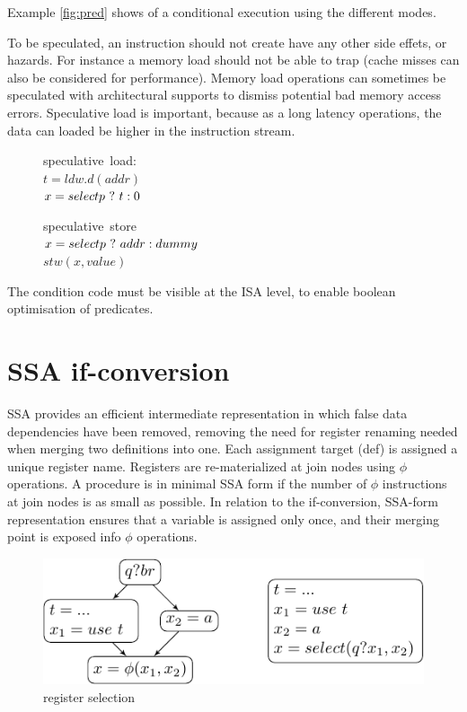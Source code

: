 Example \ref{fig:pred} shows of a conditional execution using the different modes.

To be speculated, an instruction should not create have any other side effets, or hazards. For instance a memory load should not be able to trap (cache misses can also be considered for performance). 
Memory load operations can sometimes be speculated with architectural supports to dismiss potential bad memory access errors. Speculative load is important, because as a long latency operations, the data can loaded be higher in the instruction stream.

\begin{figure}
\begin{minipage}[t]{4cm}
\mbox{speculative load:} \\
$t = ldw.d(addr) $ \\
$x = select p ~?~ t : 0 $ \\
\end{minipage}
\begin{minipage}[t]{4cm}
\mbox{speculative store} \\
$x=select p ~?~ addr : dummy $ \\
$stw (x, value) $
\end{minipage}
\label{fig:spec}
\end{figure}

The condition code must be visible at the ISA level, to enable boolean optimisation of predicates.

\section{SSA if-conversion}

SSA provides an efficient intermediate representation in which false data dependencies have been removed, removing the need for register renaming needed when merging two definitions into one. Each assignment target (def) is assigned a unique register name. Registers are re-materialized at join nodes using $\phi$ operations. A procedure is in minimal SSA form if the number of $\phi$ instructions at join nodes is as small as possible. In relation to the if-conversion, SSA-form representation ensures that a variable is assigned only once, and their merging point is exposed info $\phi$ operations.

\begin{figure}
\centering
    \includegraphics[scale=0.8]{ssa.pdf}
\caption{register selection}
\label{fig:ssa1}
\end{figure}

